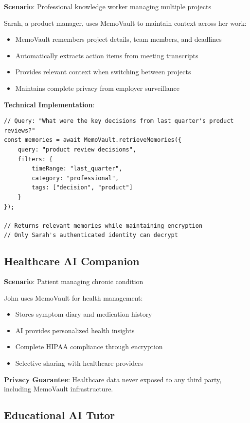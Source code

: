 \documentclass[12pt, a4paper]{article}
\begin{document}
\textbf{Scenario}: Professional knowledge worker managing multiple projects

Sarah, a product manager, uses MemoVault to maintain context across her work:
\begin{itemize}
    \item MemoVault remembers project details, team members, and deadlines
    \item Automatically extracts action items from meeting transcripts
    \item Provides relevant context when switching between projects
    \item Maintains complete privacy from employer surveillance
\end{itemize}

\textbf{Technical Implementation}:
\begin{verbatim}
// Query: "What were the key decisions from last quarter's product reviews?"
const memories = await MemoVault.retrieveMemories({
    query: "product review decisions",
    filters: {
        timeRange: "last_quarter",
        category: "professional",
        tags: ["decision", "product"]
    }
});

// Returns relevant memories while maintaining encryption
// Only Sarah's authenticated identity can decrypt
\end{verbatim}

\subsection{Healthcare AI Companion}

\textbf{Scenario}: Patient managing chronic condition

John uses MemoVault for health management:
\begin{itemize}
    \item Stores symptom diary and medication history
    \item AI provides personalized health insights
    \item Complete HIPAA compliance through encryption
    \item Selective sharing with healthcare providers
\end{itemize}

\textbf{Privacy Guarantee}: Healthcare data never exposed to any third party, including MemoVault infrastructure.

\subsection{Educational AI Tutor}
\end{document}
